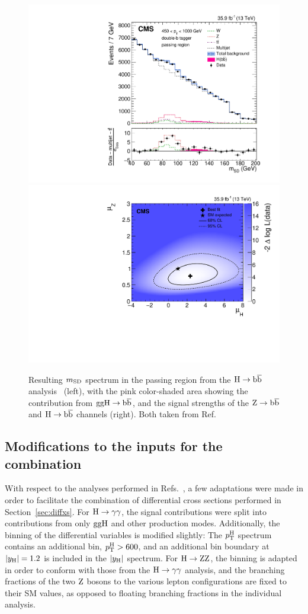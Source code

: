 \begin{figure}[hbtp]
  \begin{center}
    \includegraphics[width=0.49\linewidth]{img/inputs/hbb/msd.pdf}
    \includegraphics[width=0.49\linewidth]{img/inputs/hbb/signalstrengths.pdf}
    \caption{
        Resulting $m_\mathrm{SD}$ spectrum in the passing region from the $\mathrm{H}\to\mathrm{b}\overline{\mathrm{b}}$ analysis~\cite{Sirunyan:2017dgc} (left), with the pink color-shaded area showing the contribution from $\mathrm{g}\mathrm{g}\mathrm{H}\to\mathrm{b}\overline{\mathrm{b}}$, and the signal strengths of the $\mathrm{Z}\to\mathrm{b}\overline{\mathrm{b}}$ and $\mathrm{H}\to\mathrm{b}\overline{\mathrm{b}}$ channels (right).
        Both taken from Ref.~\cite{Sirunyan:2017dgc}
        }
    \label{fig:hbbresults}
  \end{center}
\end{figure}



\subsection{Modifications to the inputs for the combination}

With respect to the analyses performed in Refs.~\cite{Sirunyan:2018kta,Sirunyan:2017exp,Sirunyan:2017dgc}, a few adaptations were made in order to facilitate the combination of differential cross sections performed in Section~\ref{sec:diffxs}.
% 
For $\mathrm{H}\to\mathrm{\gamma}\mathrm{\gamma}$, the signal contributions were split into contributions from only $\mathrm{g}\mathrm{g}\mathrm{H}$ and other production modes.
% 
Additionally, the binning of the differential variables is modified slightly: The $p_\mathrm{T}^\mathrm{H}$ spectrum contains an additional bin, $p_\mathrm{T}^\mathrm{H}>600$\GeV, and an additional bin boundary at $\left|y_\mathrm{H}\right|  = 1.2$ is included in the $\left|y_\mathrm{H}\right| $ spectrum.
% 
For $\mathrm{H}\to\mathrm{Z}\mathrm{Z}$, the binning is adapted in order to conform with those from the $\mathrm{H}\to\mathrm{\gamma}\mathrm{\gamma}$ analysis, and the branching fractions of the two $\mathrm{Z}$ bosons to the various lepton configurations are fixed to their SM values, as opposed to floating branching fractions in the individual analysis.

